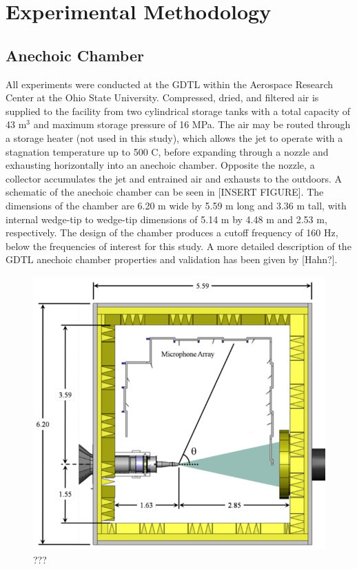 \chapter{Experimental Methodology}
\label{methodology}

\section{Anechoic Chamber}
All experiments were conducted at the GDTL within the Aerospace Research Center at the Ohio State University. 
Compressed, dried, and filtered air is supplied to the facility from two cylindrical storage tanks with a total capacity of 43 m$^{3}$ and maximum storage pressure of 16 MPa.
The air may be routed through a storage heater (not used in this study), which allows the jet to operate with a stagnation temperature up to 500 C, before expanding through a nozzle and exhausting horizontally into an anechoic chamber. 
Opposite the nozzle, a collector accumulates the jet and entrained air and exhausts to the outdoors. 
A schematic of the anechoic chamber can be seen in [INSERT FIGURE]. 
The dimensions of the chamber are 6.20 m wide by 5.59 m long and 3.36 m tall, with internal wedge-tip to wedge-tip dimensions of 5.14 m by 4.48 m and 2.53 m, respectively. 
The design of the chamber produces a cutoff frequency of 160 Hz, below the frequencies of interest for this study. 
A more detailed description of the GDTL anechoic chamber properties and validation has been given by [Hahn?].
\begin{figure}
	\centering
	\includegraphics{Figures/Chamber_Schematic.png}
	\caption{???} \label{fig:chamber}
\end{figure}

